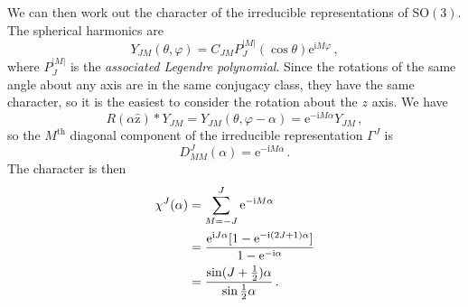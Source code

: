 \documentclass{article}
\theoremstyle{plain}\theoremheaderfont{\normalfont\itshape}\theorembodyfont{\rmfamily}\theoremseparator{.}\newtheorem*{rem}{Remark}\newtheorem*{ex}{Example}\newtheorem*{proof}{Proof}\newtheorem*{altp}{Alternative proof}
\theoremstyle{plain}\theoremheaderfont{\normalfont\bfseries}\theorembodyfont{\rmfamily}\theoremseparator{.}\newtheorem{thm}{Theorem}[section]\newtheorem{lem}[thm]{Lemma}\newtheorem{prop}[thm]{Proposition}\newtheorem*{cor}{Corollary}\newtheorem{defn}[thm]{Definition}\newtheorem{clm}[thm]{Claim}\newtheorem{clminproof}{Claim}\newtheorem*{law}{Law}\newtheorem{pos}[thm]{Postulate}
\theoremstyle{break}\theoremheaderfont{\normalfont\itshape}\theorembodyfont{\rmfamily}\theoremseparator{.\medskip}\newtheorem*{proofskip}{Proof}\newtheorem*{exs}{Examples}\newtheorem*{rems}{Remarks}
\theoremstyle{break}\theoremheaderfont{\normalfont\bfseries}\theorembodyfont{\rmfamily}\theoremseparator{.\medskip}\newtheorem{lemskip}[thm]{Lemma}\newtheorem{defnskip}[thm]{Definition}\newtheorem{propskip}[thm]{Proposition}\newtheorem{thmskip}[thm]{Theorem}
\numberwithin{equation}{section}
\newcommand{\ii}{\mathrm{i}}
\newcommand{\ee}{\mathrm{e}}
\newcommand{\vu}[1]{\hat{\bm{\mathrm{#1}}}}
\newcommand{\abs}[1]{\left| #1 \right|}
\newcommand{\SO}{\mathrm{SO}}
\begin{document}
    We can then work out the character of the irreducible representations of \(\SO(3)\). The spherical harmonics are
    \begin{equation}
        Y_{JM}(\theta,\varphi)=C_{JM}P_{J}^{\abs{M}}(\cos\theta)\ee^{\ii M\varphi}\,,
    \end{equation}
    where \(P_J^{\abs{M}}\) is the \textit{associated Legendre polynomial}. Since the rotations of the same angle about any axis are in the same conjugacy class, they have the same character, so it is the easiest to consider the rotation about the \(z\) axis. We have
    \begin{equation}
        R(\alpha\vu{z})*Y_{JM}=Y_{JM}(\theta,\varphi-\alpha)=\ee^{-\ii M\alpha}Y_{JM}\,,
    \end{equation}
    so the \(M^{\text{th}}\) diagonal component of the irreducible representation \(\Gamma^{J}\) is
    \begin{equation}
        D_{MM}^{J}(\alpha)=\ee^{-\ii M\alpha}\,.
    \end{equation}
    The character is then
    \begin{align}
        \chi^{J}(\alpha)&=\sum_{M=-J}^{J}\ee^{-\ii M\alpha}\notag\\
        &=\frac{\ee^{\ii J\alpha}[1-\ee^{-\ii(2J+1)\alpha}]}{1-\ee^{-\ii \alpha}}\notag\\
        &=\frac{\sin(J+\frac{1}{2})\alpha}{\sin\frac{1}{2}\alpha}\,.
    \end{align}
\end{document}
